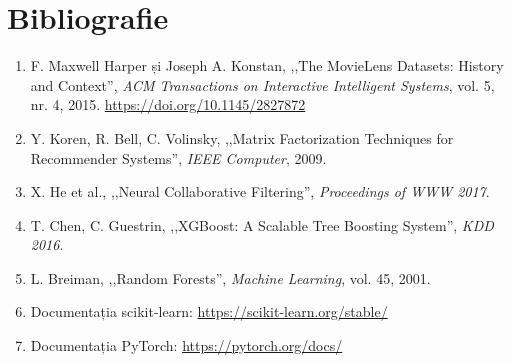 \documentclass[12pt,a4paper]{article}
\begin{document}
\section*{Bibliografie}

\begin{enumerate}[noitemsep]
    \item F. Maxwell Harper și Joseph A. Konstan, ,,The MovieLens Datasets: History and Context'', \textit{ACM Transactions on Interactive Intelligent Systems}, vol. 5, nr. 4, 2015. \url{https://doi.org/10.1145/2827872}
    \item Y. Koren, R. Bell, C. Volinsky, ,,Matrix Factorization Techniques for Recommender Systems'', \textit{IEEE Computer}, 2009.
    \item X. He et al., ,,Neural Collaborative Filtering'', \textit{Proceedings of WWW 2017}.
    \item T. Chen, C. Guestrin, ,,XGBoost: A Scalable Tree Boosting System'', \textit{KDD 2016}.
    \item L. Breiman, ,,Random Forests'', \textit{Machine Learning}, vol. 45, 2001.
    \item Documentația scikit-learn: \url{https://scikit-learn.org/stable/}
    \item Documentația PyTorch: \url{https://pytorch.org/docs/}
\end{enumerate}
\end{document}
